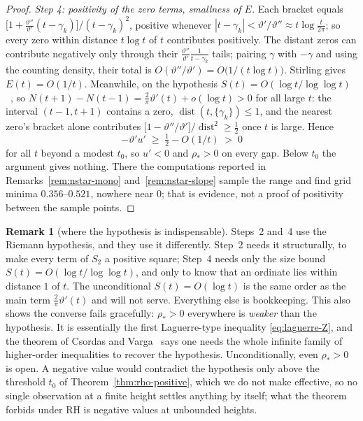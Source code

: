 \documentclass[11pt]{article}
\theoremstyle{definition}
\newtheorem{remark}[theorem]{Remark}
\begin{document}
\begin{proof}
\emph{Step 4: positivity of the zero terms, smallness of $E$.}
Each bracket equals
$\bigl[1+\tfrac{\vartheta''}{\vartheta'}(t-\gamma_k)\bigr]/(t-\gamma_k)^{2}$,
positive whenever
$|t-\gamma_k|<\vartheta'/\vartheta''\approx t\log\tfrac{t}{2\pi}$;
so every zero within distance $t\log t$ of $t$ contributes positively. The
distant zeros can contribute negatively only through their
$\tfrac{\vartheta''}{\vartheta'}\tfrac1{t-\gamma_k}$ tails; pairing $\gamma$
with $-\gamma$ and using the counting density, their total is
$O(\vartheta''/\vartheta')=O\bigl(1/(t\log t)\bigr)$.
Stirling gives $E(t)=O(1/t)$. Meanwhile, on the hypothesis
$S(t)=O(\log t/\log\log t)$~\cite[Theorem~14.13]{Titchmarsh1986}, so
$N(t+1)-N(t-1)=\tfrac{2}{\pi}\vartheta'(t)+o(\log t)>0$ for all large $t$:
the interval $(t-1,t+1)$ contains a zero,
$\operatorname{dist}(t,\{\gamma_k\})\leq1$, and the nearest zero's bracket
alone contributes
$\bigl[1-\vartheta''/\vartheta'\bigr]/\operatorname{dist}^{2}\geq\tfrac12$
once $t$ is large. Hence
\[
-\vartheta'u'\;\geq\;\tfrac12-O(1/t)\;>\;0
\]
for all $t$ beyond a modest $t_0$, so $u'<0$ and $\rho_{\ast}>0$ on every gap.
Below $t_0$ the argument gives nothing. There the computations reported in
Remarks~\ref{rem:nstar-mono} and~\ref{rem:nstar-slope} sample the range and
find grid minima $0.356$--$0.521$, nowhere near $0$; that is evidence, not a
proof of positivity between the sample points.
\end{proof}

\begin{remark}[where the hypothesis is indispensable]\label{rem:rh-role}
Steps~2 and~4 use the Riemann hypothesis, and they use it differently.
Step~2 needs it structurally, to make every term of $S_2$ a positive square;
Step~4 needs only the size bound $S(t)=O(\log t/\log\log t)$, and only to know
that an ordinate lies within distance $1$ of $t$. The unconditional
$S(t)=O(\log t)$ is the same order as the main term $\tfrac2\pi\vartheta'(t)$
and will not serve. Everything else is bookkeeping.
This also shows the converse fails gracefully: $\rho_{\ast}>0$ everywhere is
\emph{weaker} than the hypothesis. It is essentially the first
Laguerre-type inequality \eqref{eq:laguerre-Z}, and the theorem of Csordas
and Varga~\cite{CsordasVarga1990} says one needs the whole infinite family
of higher-order inequalities to recover the hypothesis. Unconditionally,
even $\rho_{\ast}>0$ is open. A negative value would contradict the hypothesis
only above the threshold $t_0$ of Theorem~\ref{thm:rho-positive}, which we do
not make effective, so no single observation at a finite height settles
anything by itself; what the theorem forbids under RH is negative values at
unbounded heights.
\end{remark}
\end{document}

